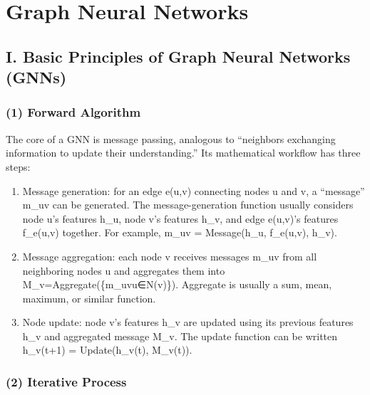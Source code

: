 \setcounter{section}{0}

\hypertarget{graph-neural-networks-1}{%
\section{Graph Neural Networks}\label{graph-neural-networks-1}}

\hypertarget{i.-basic-principles-of-graph-neural-networks-gnns}{%
\subsection{I. Basic Principles of Graph Neural Networks (GNNs)}\label{i.-basic-principles-of-graph-neural-networks-gnns}}

\hypertarget{forward-algorithm}{%
\subsubsection{(1) Forward Algorithm}\label{forward-algorithm}}

The core of a GNN is message passing, analogous to ``neighbors exchanging information to update their understanding.'' Its mathematical workflow has three steps:

\begin{enumerate}
\def\labelenumi{\arabic{enumi}.}
\item
  Message generation: for an edge e(u,v) connecting nodes u and v, a ``message'' m\_uv can be generated. The message-generation function usually considers node u's features h\_u, node v's features h\_v, and edge e(u,v)'s features f\_e(u,v) together. For example, m\_uv = Message(h\_u, f\_e(u,v), h\_v).
\item
  Message aggregation: each node v receives messages m\_uv from all neighboring nodes u and aggregates them into M\_v=Aggregate(\{m\_uv\textbar u∈N(v)\}). Aggregate is usually a sum, mean, maximum, or similar function.
\item
  Node update: node v's features h\_v are updated using its previous features h\_v and aggregated message M\_v. The update function can be written h\_v(t+1) = Update(h\_v(t), M\_v(t)).
\end{enumerate}

\hypertarget{iterative-process}{%
\subsubsection{(2) Iterative Process}\label{iterative-process}}

